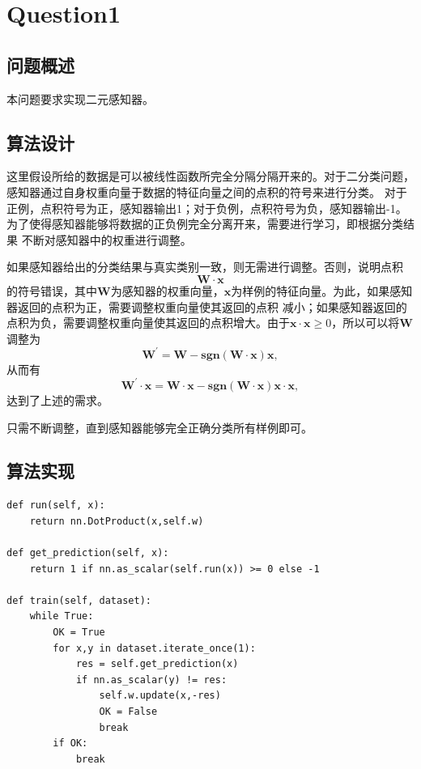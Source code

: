 \chapter{Question1}
\section{问题概述}
%
%
本问题要求实现二元感知器。

%
%

%
%

\section{算法设计}
%
%
这里假设所给的数据是可以被线性函数所完全分隔分隔开来的。对于二分类问题，感知器通过自身权重向量于数据的特征向量之间的点积的符号来进行分类。
对于正例，点积符号为正，感知器输出1；对于负例，点积符号为负，感知器输出-1。为了使得感知器能够将数据的正负例完全分离开来，需要进行学习，即根据分类结果
不断对感知器中的权重进行调整。

如果感知器给出的分类结果与真实类别一致，则无需进行调整。否则，说明点积
\[\mathbf{W}\cdot\mathbf{x}\]
的符号错误，其中$\mathbf{W}$为感知器的权重向量，$\mathbf{x}$为样例的特征向量。为此，如果感知器返回的点积为正，需要调整权重向量使其返回的点积
减小；如果感知器返回的点积为负，需要调整权重向量使其返回的点积增大。由于$\mathbf{x}\cdot\mathbf{x}\geq 0$，所以可以将$\mathbf{W}$
调整为
\[\mathbf{W}^{\prime}=\mathbf{W}-\mathbf{sgn}(\mathbf{W}\cdot\mathbf{x})\mathbf{x},\]
从而有
\[\mathbf{W}^{\prime}\cdot\mathbf{x}=\mathbf{W}\cdot\mathbf{x}-\mathbf{sgn}(\mathbf{W}\cdot\mathbf{x})\mathbf{x}\cdot\mathbf{x},\]
达到了上述的需求。

只需不断调整，直到感知器能够完全正确分类所有样例即可。
\section{算法实现}
%
%
%
\begin{lstlisting}[emph={[3]dataset,x},emphstyle={[3]\color{vscode_parametercolor}},emph={[4]GameState,MinimaxAgent,AlphaBetaAgent},emphstyle={[4]\color{vscode_classcolor}}]
def run(self, x):
    return nn.DotProduct(x,self.w)

def get_prediction(self, x):
    return 1 if nn.as_scalar(self.run(x)) >= 0 else -1

def train(self, dataset):
    while True:
        OK = True
        for x,y in dataset.iterate_once(1):
            res = self.get_prediction(x)
            if nn.as_scalar(y) != res:
                self.w.update(x,-res)
                OK = False
                break
        if OK:
            break
\end{lstlisting}

